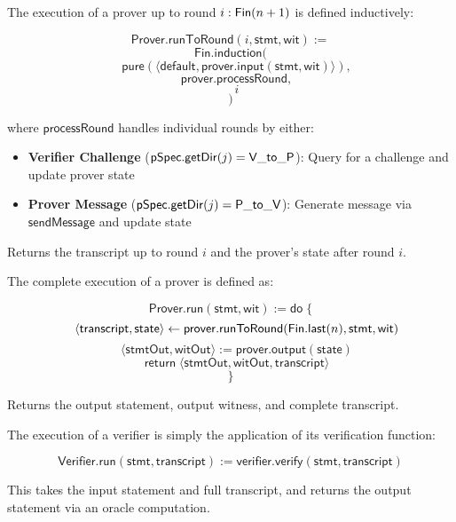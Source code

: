 \begin{definition}
    \label{def:prover_run_to_round}
    The execution of a prover up to round $i : \mathsf{Fin}(n+1)$ is defined inductively:

    \[ \mathsf{Prover}.\mathsf{runToRound}(i, \mathsf{stmt}, \mathsf{wit}) := \]
    \[ \mathsf{Fin}.\mathsf{induction}( \]
    \[ \quad \mathsf{pure}(\langle \mathsf{default}, \mathsf{prover}.\mathsf{input}(\mathsf{stmt}, \mathsf{wit}) \rangle), \]
    \[ \quad \mathsf{prover}.\mathsf{processRound}, \]
    \[ \quad i \]
    \[ ) \]

    where $\mathsf{processRound}$ handles individual rounds by either:
    \begin{itemize}
        \item \textbf{Verifier Challenge} ($\mathsf{pSpec}.\mathsf{getDir}(j) = \mathsf{V\_to\_P}$): Query for a challenge and update prover state
        \item \textbf{Prover Message} ($\mathsf{pSpec}.\mathsf{getDir}(j) = \mathsf{P\_to\_V}$): Generate message via $\mathsf{sendMessage}$ and update state
    \end{itemize}

    Returns the transcript up to round $i$ and the prover's state after round $i$.
\end{definition}

\begin{definition}
    \label{def:prover_run}
    The complete execution of a prover is defined as:

    \[ \mathsf{Prover}.\mathsf{run}(\mathsf{stmt}, \mathsf{wit}) := \mathsf{do} \; \{ \]
    \[ \quad \langle \mathsf{transcript}, \mathsf{state} \rangle \leftarrow \mathsf{prover}.\mathsf{runToRound}(\mathsf{Fin}.\mathsf{last}(n), \mathsf{stmt}, \mathsf{wit}) \]
    \[ \quad \langle \mathsf{stmtOut}, \mathsf{witOut} \rangle := \mathsf{prover}.\mathsf{output}(\mathsf{state}) \]
    \[ \quad \mathsf{return} \; \langle \mathsf{stmtOut}, \mathsf{witOut}, \mathsf{transcript} \rangle \]
    \[ \} \]

    Returns the output statement, output witness, and complete transcript.
\end{definition}

\begin{definition}
    \label{def:verifier_run}
    The execution of a verifier is simply the application of its verification function:

    \[ \mathsf{Verifier}.\mathsf{run}(\mathsf{stmt}, \mathsf{transcript}) := \mathsf{verifier}.\mathsf{verify}(\mathsf{stmt}, \mathsf{transcript}) \]

    This takes the input statement and full transcript, and returns the output statement via an oracle computation.
\end{definition}

